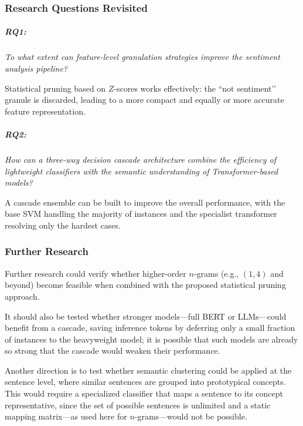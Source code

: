 \documentclass[a4paper,fleqn]{cas-dc}
\newcommand{\zscore}{Z}
\begin{document}
\subsubsection{Research Questions Revisited}

\subparagraph{RQ1:} \emph{To what extent can feature-level granulation strategies improve the sentiment analysis pipeline?}

Statistical pruning based on $\zscore$-scores works effectively: the ``not sentiment’’ granule is discarded, leading to a more compact and equally or more accurate feature representation.

\subparagraph{RQ2:} \emph{How can a three-way decision cascade architecture combine the efficiency of lightweight classifiers with the semantic understanding of Transformer-based models?}

A cascade ensemble can be built to improve the overall performance, with the base SVM handling the majority of instances and the specialist transformer resolving only the hardest cases.

\subsubsection{Further Research}

Further research could verify whether higher-order $n$-grams (e.g., $(1,4)$ and beyond) become feasible when combined with the proposed statistical pruning approach.

It should also be tested whether stronger models---full BERT or LLMs---could benefit from a cascade, saving inference tokens by deferring only a small fraction of instances to the heavyweight model; it is possible that such models are already so strong that the cascade would weaken their performance.

Another direction is to test whether semantic clustering could be applied at the sentence level, where similar sentences are grouped into prototypical concepts. This would require a specialized classifier that maps a sentence to its concept representative, since the set of possible sentences is unlimited and a static mapping matrix---as used here for $n$-grams---would not be possible.
\end{document}
